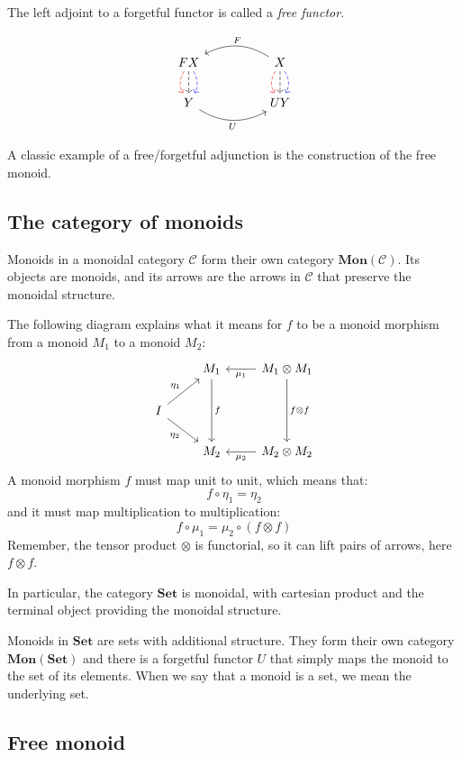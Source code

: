 \documentclass[DaoFP]{subfiles}
\begin{document}
The left adjoint to a forgetful functor is called a \emph{free functor}.

\[
 \begin{tikzcd}
F X
\arrow[d, bend right, red, dashed]
\arrow[d, dashed]
\arrow[d, bend left, blue, dashed]
  &&
  X
\arrow[d, bend right, red, dashed]
\arrow[d, dashed]
\arrow[d, bend left, blue, dashed]
 \arrow[ll, bend right, "F"']
 \\
Y
   \arrow[rr, bend right, "U"']
 &&
 U Y
  \end{tikzcd}
\]

A classic example of a free/forgetful adjunction is the construction of the free monoid.


\subsection{The category of monoids}
Monoids in a monoidal category $\mathcal{C}$ form their own category $\mathbf{Mon}(\mathcal{C})$. Its objects are monoids, and its arrows are the arrows in $\mathcal{C}$ that preserve the monoidal structure. 

The following diagram explains what it means for $f$ to be a monoid morphism from a monoid $M_1$ to a monoid $M_2$:
\[
 \begin{tikzcd}
 & M_1
 \arrow[dd, "f"]
 & M_1 \otimes M_1
 \arrow[l, "\mu_1"]
 \arrow[dd, "f \otimes f"]
 \\
 I
 \arrow[ru, "\eta_1"]
 \arrow[rd, "\eta_2"']
 \\
 & M_2
 & M_2 \otimes M_2
 \arrow[l, "\mu_2"]
  \end{tikzcd}
\]
A monoid morphism $f$ must map unit to unit, which means that:
\[ f \circ \eta_1 = \eta_2 \]
and it must map multiplication to multiplication:
\[ f \circ \mu_1 = \mu_2 \circ (f \otimes f)\]
Remember, the tensor product $\otimes$ is functorial, so it can lift pairs of arrows, here $f \otimes f$.

In particular, the category $\mathbf{Set}$ is monoidal, with cartesian product and the terminal object providing the monoidal structure. 

Monoids in $\mathbf{Set}$ are sets with additional structure. They form their own category $\mathbf{Mon}(\mathbf{Set})$ and there is a forgetful functor $U$ that simply maps the monoid to the set of its elements. When we say that a monoid is a set, we mean the underlying set.

\subsection{Free monoid}
\end{document}

